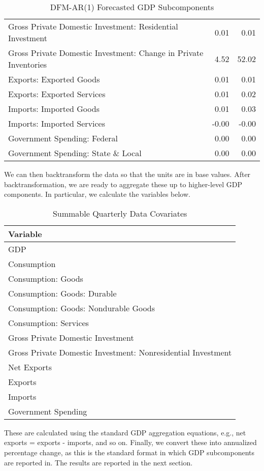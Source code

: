 \documentclass[11pt, letterpaper]{article}\usepackage[]{graphicx}\usepackage[]{color}
\begin{document}
\begin{table}[H]
\begin{tabular}{lrr}
  Gross Private Domestic Investment: Residential Investment & 0.01 & 0.01 \\ 
  Gross Private Domestic Investment: Change in Private Inventories & 4.52 & 52.02 \\ 
  Exports: Exported Goods & 0.01 & 0.01 \\ 
  Exports: Exported Services & 0.01 & 0.02 \\ 
  Imports: Imported Goods & 0.01 & 0.03 \\ 
  Imports: Imported Services & -0.00 & -0.00 \\ 
  Government Spending: Federal & 0.00 & 0.00 \\ 
  Government Spending: State \& Local & 0.00 & 0.00 \\ 
   \hline
\end{tabular}
\endgroup
\caption{DFM-AR(1) Forecasted GDP Subcomponents} 
\end{table}


We can then backtransform the data so that the units are in base values. After backtransformation, we are ready to aggregate these up to higher-level GDP components. In particular, we calculate the variables below.
\begin{table}[H]
\centering
\begingroup\scriptsize
\begin{tabular}{l}
  \hline
Variable \\ 
  \hline
GDP \\ 
  Consumption \\ 
  Consumption: Goods \\ 
  Consumption: Goods: Durable \\ 
  Consumption: Goods: Nondurable Goods \\ 
  Consumption: Services \\ 
  Gross Private Domestic Investment \\ 
  Gross Private Domestic Investment: Nonresidential Investment \\ 
  Net Exports \\ 
  Exports \\ 
  Imports \\ 
  Government Spending \\ 
   \hline
\end{tabular}
\endgroup
\caption{Summable Quarterly Data Covariates} 
\end{table}

These are calculated using the standard GDP aggregation equations, e.g., net exports = exports - imports, and so on.
Finally, we convert these into annualized percentage change, as this is the standard format in which GDP subcomponents are reported in. The results are reported in the next section.
\end{document}

